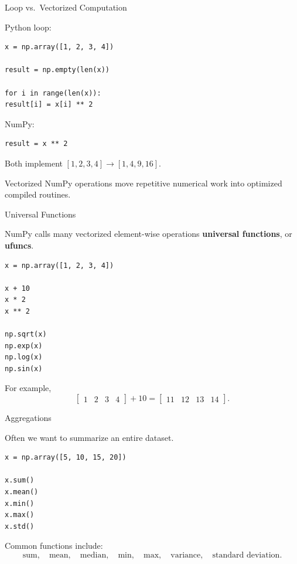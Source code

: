 \documentclass[11pt,aspectratio=43]{beamer}
\begin{document}
\begin{frame}[fragile]{Loop vs.\ Vectorized Computation}

Python loop:

\begin{lstlisting}
x = np.array([1, 2, 3, 4])

result = np.empty(len(x))

for i in range(len(x)):
result[i] = x[i] ** 2
\end{lstlisting}

NumPy:

\begin{lstlisting}
result = x ** 2
\end{lstlisting}

Both implement
$
[1,2,3,4]
\longrightarrow
[1,4,9,16].
$

\begin{block}{}
Vectorized NumPy operations move repetitive numerical work into
optimized compiled routines.
\end{block}

\end{frame}

\begin{frame}[fragile]{Universal Functions}

NumPy calls many vectorized element-wise operations
\textbf{universal functions}, or \textbf{ufuncs}.

\begin{lstlisting}
x = np.array([1, 2, 3, 4])

x + 10
x * 2
x ** 2

np.sqrt(x)
np.exp(x)
np.log(x)
np.sin(x)
\end{lstlisting}

For example,
\[
\begin{bmatrix}
1&2&3&4
\end{bmatrix}
+10
=
\begin{bmatrix}
11&12&13&14
\end{bmatrix}.
\]

\end{frame}

\begin{frame}[fragile]{Aggregations}

Often we want to summarize an entire dataset.

\begin{lstlisting}
x = np.array([5, 10, 15, 20])

x.sum()
x.mean()
x.min()
x.max()
x.std()
\end{lstlisting}

Common functions include:
\[
\text{sum},\quad
\text{mean},\quad
\text{median},\quad
\text{min},\quad
\text{max},\quad
\text{variance},\quad
\text{standard deviation}.
\]

\end{frame}
\end{document}
